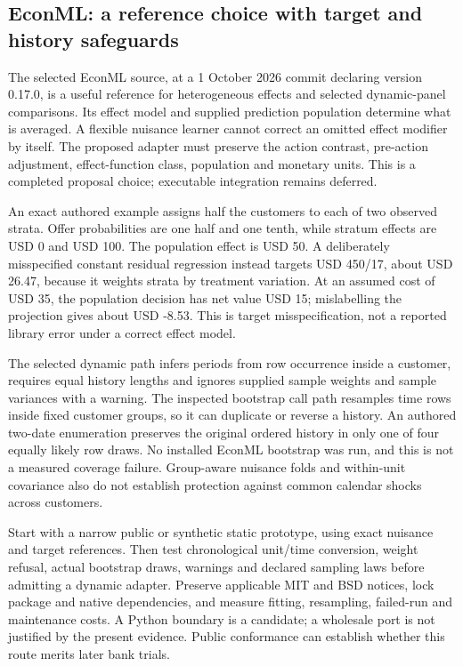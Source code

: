 \hypertarget{econml-a-reference-choice-with-target-and-history-safeguards}{%
\subsection{EconML: a reference choice with target and history
safeguards}\label{econml-a-reference-choice-with-target-and-history-safeguards}}

The selected EconML source, at a 1 October 2026 commit declaring version
0.17.0, is a useful reference for heterogeneous effects and selected
dynamic-panel comparisons. Its effect model and supplied prediction
population determine what is averaged. A flexible nuisance learner
cannot correct an omitted effect modifier by itself. The proposed
adapter must preserve the action contrast, pre-action adjustment,
effect-function class, population and monetary units. This is a
completed proposal choice; executable integration remains deferred.
\citep{exec19_econml_source}

An exact authored example assigns half the customers to each of two
observed strata. Offer probabilities are one half and one tenth, while
stratum effects are USD 0 and USD 100. The population effect is USD 50.
A deliberately misspecified constant residual regression instead targets
USD 450/17, about USD 26.47, because it weights strata by treatment
variation. At an assumed cost of USD 35, the population decision has net
value USD 15; mislabelling the projection gives about USD -8.53. This is
target misspecification, not a reported library error under a correct
effect model. \citep{exec19_econml_reference}

The selected dynamic path infers periods from row occurrence inside a
customer, requires equal history lengths and ignores supplied sample
weights and sample variances with a warning. The inspected bootstrap
call path resamples time rows inside fixed customer groups, so it can
duplicate or reverse a history. An authored two-date enumeration
preserves the original ordered history in only one of four equally
likely row draws. No installed EconML bootstrap was run, and this is not
a measured coverage failure. Group-aware nuisance folds and within-unit
covariance also do not establish protection against common calendar
shocks across customers.
\citep{exec19_econml_source,exec19_econml_reference}

Start with a narrow public or synthetic static prototype, using exact
nuisance and target references. Then test chronological unit/time
conversion, weight refusal, actual bootstrap draws, warnings and
declared sampling laws before admitting a dynamic adapter. Preserve
applicable MIT and BSD notices, lock package and native dependencies,
and measure fitting, resampling, failed-run and maintenance costs. A
Python boundary is a candidate; a wholesale port is not justified by the
present evidence. Public conformance can establish whether this route
merits later bank trials. \citep{exec19_econml_source}

